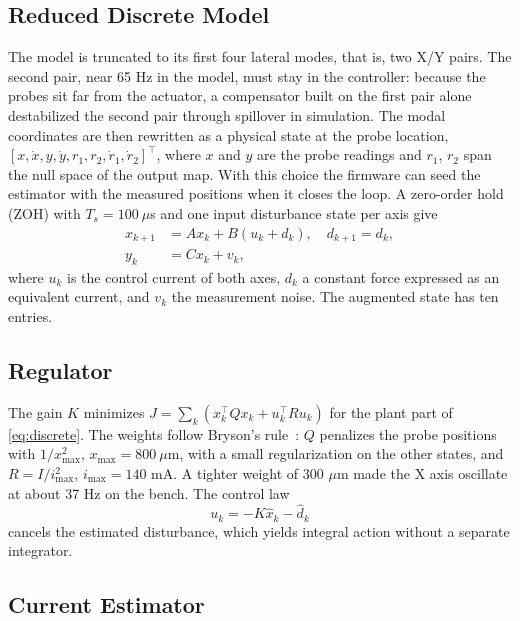 \documentclass[conference]{IEEEtran}
\begin{document}
\subsection{Reduced Discrete Model}

The model is truncated to its first four lateral modes, that is, two X/Y pairs. The second pair, near 65 Hz in the model, must stay in the controller: because the probes sit far from the actuator, a compensator built on the first pair alone destabilized the second pair through spillover in simulation. The modal coordinates are then rewritten as a physical state at the probe location, $[x, \dot{x}, y, \dot{y}, r_1, r_2, \dot{r}_1, \dot{r}_2]^\top$, where $x$ and $y$ are the probe readings and $r_1$, $r_2$ span the null space of the output map. With this choice the firmware can seed the estimator with the measured positions when it closes the loop. A zero-order hold (ZOH) with $T_s = 100~\mu$s and one input disturbance state per axis give
\begin{equation}
\begin{aligned}
x_{k+1} &= A x_k + B (u_k + d_k), \quad d_{k+1} = d_k,\\
y_k &= C x_k + v_k,
\end{aligned} \label{eq:discrete}
\end{equation}
where $u_k$ is the control current of both axes, $d_k$ a constant force expressed as an equivalent current, and $v_k$ the measurement noise. The augmented state has ten entries.

\subsection{Regulator}

The gain $K$ minimizes $J = \sum_k (x_k^\top Q x_k + u_k^\top R u_k)$ for the plant part of \eqref{eq:discrete}. The weights follow Bryson's rule~\cite{bryson1975applied}: $Q$ penalizes the probe positions with $1/x_\text{max}^2$, $x_\text{max} = 800~\mu$m, with a small regularization on the other states, and $R = I/i_\text{max}^2$, $i_\text{max} = 140$ mA. A tighter weight of 300 $\mu$m made the X axis oscillate at about 37 Hz on the bench. The control law
\begin{equation}
u_k = -K \hat{x}_k - \hat{d}_k \label{eq:law}
\end{equation}
cancels the estimated disturbance, which yields integral action without a separate integrator.

\subsection{Current Estimator}
\end{document}
